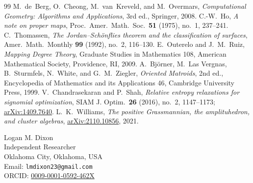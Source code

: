 \documentclass[11pt,twoside,leqno]{article}
\theoremstyle{plain}
\theoremstyle{definition}
\theoremstyle{remark}
\begin{document}
\begin{sloppypar}
\begin{thebibliography}{99}
 M.~de~Berg, O.~Cheong, M.~van~Kreveld, and M.~Overmars, \emph{Computational Geometry: Algorithms and Applications}, 3rd ed., Springer, 2008.
 C.-W.~Ho, \emph{A note on proper maps}, Proc.\ Amer.\ Math.\ Soc.\ \textbf{51} (1975), no.~1, 237--241.
 C.~Thomassen, \emph{The Jordan--Sch\"onflies theorem and the classification of surfaces}, Amer.\ Math.\ Monthly \textbf{99} (1992), no.~2, 116--130.
 E.~Outerelo and J.~M.~Ruiz, \emph{Mapping Degree Theory}, Graduate Studies in Mathematics 108, American Mathematical Society, Providence, RI, 2009.
 A.~Bj\"orner, M.~Las Vergnas, B.~Sturmfels, N.~White, and G.~M.~Ziegler, \emph{Oriented Matroids}, 2nd ed., Encyclopedia of Mathematics and its Applications 46, Cambridge University Press, 1999.
 V.~Chandrasekaran and P.~Shah, \emph{Relative entropy relaxations for signomial optimization}, SIAM J. Optim.\ \textbf{26} (2016), no.~2, 1147--1173; \href{https://arxiv.org/abs/1409.7640}{arXiv:1409.7640}.
 L.~K.~Williams, \emph{The positive Grassmannian, the amplituhedron, and cluster algebras}, \href{https://arxiv.org/abs/2110.10856}{arXiv:2110.10856}, 2021.
\end{thebibliography}
\end{sloppypar}

\bigskip
\noindent Logan M. Dixon\\
Independent Researcher\\
Oklahoma City, Oklahoma, USA\\
Email: \texttt{lmdixon23@gmail.com}\\
ORCID: \href{https://orcid.org/0009-0001-0592-462X}{0009-0001-0592-462X}
\end{document}
